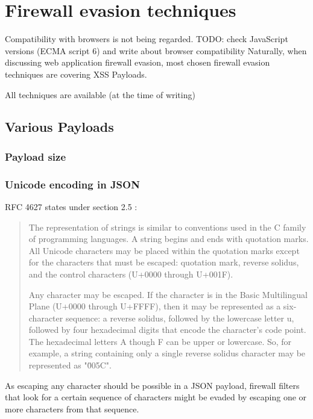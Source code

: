 \section{Firewall evasion techniques}

Compatibility with browsers is not being regarded. {\color{red} TODO: check JavaScript versions (ECMA script 6) and write about browser compatibility}
Naturally, when discussing web application firewall evasion, most chosen firewall evasion techniques are covering XSS Payloads.

All techniques are available {\color{red}(at the time of writing)}

\subsection{Various Payloads}

\subsubsection{Payload size}

\subsubsection{Unicode encoding in JSON}
RFC 4627  states under section 2.5 :
\begin{quote}
	The representation of strings is similar to conventions used in the C
	family of programming languages.  A string begins and ends with
	quotation marks.  All Unicode characters may be placed within the
	quotation marks except for the characters that must be escaped:
	quotation mark, reverse solidus, and the control characters (U+0000
	through U+001F).

	Any character may be escaped.  If the character is in the Basic
	Multilingual Plane (U+0000 through U+FFFF), then it may be
	represented as a six-character sequence: a reverse solidus, followed
	by the lowercase letter u, followed by four hexadecimal digits that
	encode the character's code point.  The hexadecimal letters A though
	F can be upper or lowercase.  So, for example, a string containing
	only a single reverse solidus character may be represented as
	"\u005C". \cite{rfc4627}
\end{quote}
As escaping any character should be possible in a JSON payload, firewall filters that look for a certain sequence of characters might be evaded by escaping one or more characters from that sequence.


